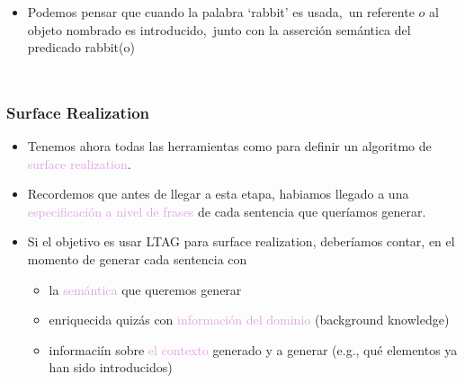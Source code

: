 \documentclass[compress,color=usenames]{beamer}
\newcommand{\mH}[1]{\textcolor{Plum}{#1}}
\begin{document}
\begin{frame}
\begin{columns}
\begin{itemize}
\item Podemos pensar que cuando la palabra `rabbit' es usada,\pause\ un referente $o$ al 
objeto nombrado es introducido,\pause\ junto con la asserci\'on sem\'antica del predicado rabbit(o) 

\end{itemize}
\end{columns}
\end{frame}

\begin{frame}
\frametitle{Surface Realization}

\begin{itemize}
\item Tenemos ahora todas las herramientas como para definir un algoritmo de \mH{surface realization}. 

\item Recordemos que antes de llegar a esta etapa, habiamos llegado a una \mH{especificaci\'on a nivel de
frases} de cada sentencia que quer\'iamos generar. 

\item Si el objetivo es usar LTAG para surface realization, deber\'iamos contar, en el momento de generar 
cada sentencia con
\begin{itemize}
\item la \mH{sem\'antica} que queremos generar 
\item enriquecida quiz\'as con \mH{informaci\'on del dominio} (background knowledge)   
\item informaci\'in sobre \mH{el contexto} generado y a generar (e.g., qu\'e elementos ya han sido introducidos)
\end{itemize}

\end{itemize}
\end{frame}
\end{document}
